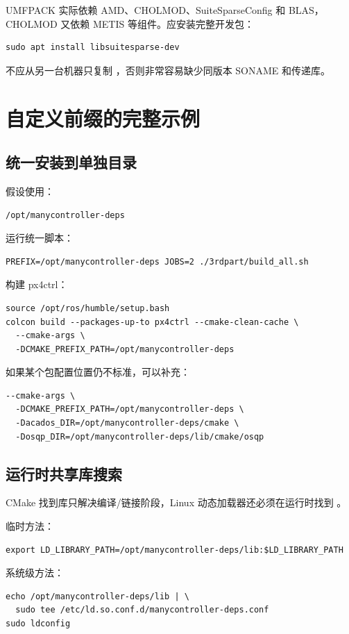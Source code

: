\documentclass[UTF8,a4paper,11pt]{ctexart}
\newcommand{\code}[1]{\texttt{\detokenize{#1}}}
\begin{document}
UMFPACK 实际依赖 AMD、CHOLMOD、SuiteSparseConfig 和 BLAS，CHOLMOD 又依赖 METIS 等组件。应安装完整开发包：
\begin{lstlisting}
sudo apt install libsuitesparse-dev
\end{lstlisting}

不应从另一台机器只复制 \code{libumfpack.so}，否则非常容易缺少同版本 SONAME 和传递库。

\section{自定义前缀的完整示例}

\subsection{统一安装到单独目录}

假设使用：
\begin{lstlisting}
/opt/manycontroller-deps
\end{lstlisting}

运行统一脚本：
\begin{lstlisting}
PREFIX=/opt/manycontroller-deps JOBS=2 ./3rdpart/build_all.sh
\end{lstlisting}

构建 px4ctrl：
\begin{lstlisting}
source /opt/ros/humble/setup.bash
colcon build --packages-up-to px4ctrl --cmake-clean-cache \
  --cmake-args \
  -DCMAKE_PREFIX_PATH=/opt/manycontroller-deps
\end{lstlisting}

如果某个包配置位置仍不标准，可以补充：
\begin{lstlisting}
--cmake-args \
  -DCMAKE_PREFIX_PATH=/opt/manycontroller-deps \
  -Dacados_DIR=/opt/manycontroller-deps/cmake \
  -Dosqp_DIR=/opt/manycontroller-deps/lib/cmake/osqp
\end{lstlisting}

\subsection{运行时共享库搜索}

CMake 找到库只解决编译/链接阶段，Linux 动态加载器还必须在运行时找到 \code{.so}。

临时方法：
\begin{lstlisting}
export LD_LIBRARY_PATH=/opt/manycontroller-deps/lib:$LD_LIBRARY_PATH
\end{lstlisting}

系统级方法：
\begin{lstlisting}
echo /opt/manycontroller-deps/lib | \
  sudo tee /etc/ld.so.conf.d/manycontroller-deps.conf
sudo ldconfig
\end{lstlisting}
\end{document}
